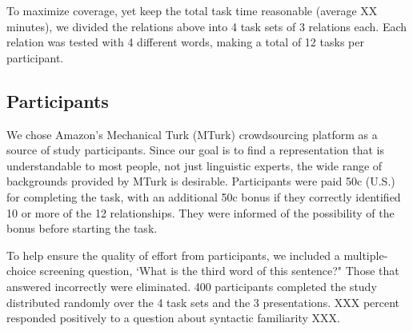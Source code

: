 To maximize coverage, yet keep the total task time reasonable (average XX minutes), we divided the relations above into 4 task sets of 3 relations each. Each relation was tested with 4 different words, making a total of 12 tasks per participant.

\subsection{Participants}
We chose Amazon's Mechanical Turk (MTurk) crowdsourcing platform as a source of study participants.  Since our goal is to find a representation that is understandable to most people, not just linguistic experts, the wide range of backgrounds provided by MTurk is desirable.
Participants were paid 50c (U.S.) for completing the task, with an additional 50c bonus if they correctly identified 10 or more of the 12 relationships. They were informed of the possibility of the bonus before starting the task.  

To help ensure the quality of effort from participants, we included a multiple-choice screening question, `What is the third word of this sentence?"  Those that answered incorrectly were eliminated. 400 participants completed the study distributed randomly over the 4 task sets and the 3 presentations. XXX percent responded positively to a question about syntactic familiarity XXX.


